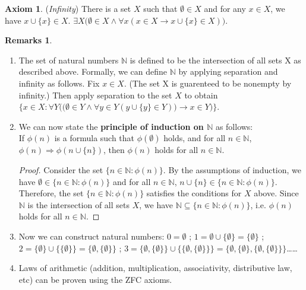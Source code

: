 \documentclass[14pt]{article}
\theoremstyle{definition}
\newtheorem*{remark}{Remarks}
\newtheorem{axiom}[definition]{Axiom}
\begin{document}
\begin{axiom}
    (\textit{Infinity}) There is a set $X$ such that $\emptyset \in X$ and for any $x\in X$, we have $x\cup \{x\}\in X$. $\exists X\big(\emptyset \in X \land \forall x(x\in X\rightarrow x\cup \{x\}\in X)\big)$.
\end{axiom}
\begin{remark}
\hfill
\begin{enumerate}
    \item The set of natural numbers $\mathbb{N}$  is defined to be the intersection of all sets X as described above.  Formally, we can define $\mathbb{N}$ by applying separation and infinity as follows. Fix $x\in X$. (The set X is guarenteed to be nonempty by infinity.)  Then apply separation to the set $X$ to obtain $\bigg\{ x\in X:\forall Y\Big(\big(\emptyset \in Y\land \forall y\in Y(y\cup\{y\}\in Y)\big)\rightarrow x\in Y\Big)\bigg\}$.
    \item We can now state the \textbf{principle of induction on $\mathbb{N}$} as follows: \\If $\phi(n)$ is a formula such that  $\phi(\emptyset)$ holds,  and for all  $n\in \mathbb{N}$, $\phi(n)\Rightarrow\phi(n\cup\{n\})$,  then  $\phi(n) $ holds for all $n\in\mathbb{N}$.  
    \begin{proof}
        Consider the set $\{n\in \mathbb{N}\colon \phi (n)\}$. By the assumptions of induction, we have $\emptyset\in\{n\in \mathbb{N}\colon \phi (n)\}$ and for all $n\in\mathbb{N}$, $n\cup\{n\}\in \{n\in \mathbb{N}\colon \phi (n)\}$. Therefore, the set $\{n\in \mathbb{N}\colon \phi (n)\}$ satisfies the conditions for $X$ above. Since $\mathbb{N}$ is the intersection of all sets $X$, we have $\mathbb{N}\subseteq \{n\in \mathbb{N}: \phi (n)\}$, i.e. $\phi(n)$ holds for all $n\in \mathbb{N}$.
    \end{proof}
    \item  Now we can construct natural numbers: $0=\emptyset$ ; $1=\emptyset\cup\{\emptyset\}=\{\emptyset\}$ ; $2=\{\emptyset\}\cup\{\{\emptyset\}\}=\{\emptyset, \{\emptyset\}\}$ ; $3=\{\emptyset, \{\emptyset\}\}\cup\{\{\emptyset, \{\emptyset\}\}\}=\{\emptyset,\{\emptyset\},\{\emptyset, \{\emptyset\}\}\}$……
    \item  Laws of arithmetic (addition, multiplication, associativity, distributive law, etc) can be proven using the ZFC axioms.
\end{enumerate}
\end{remark}

\vspace{2mm}
\end{document}
